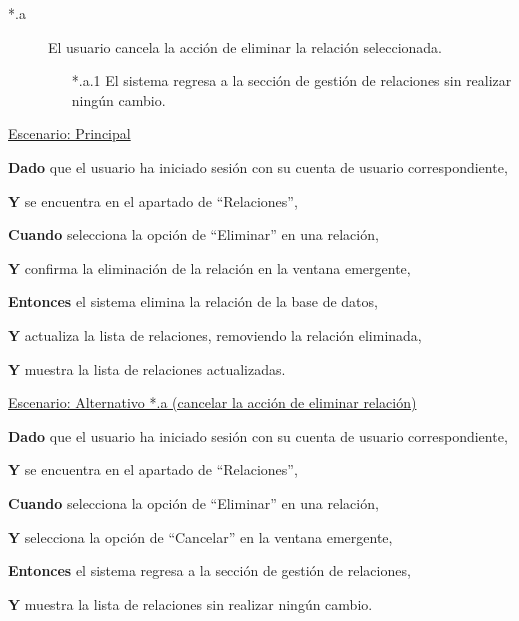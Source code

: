\begin{description}
    \item[*.a] El usuario cancela la acción de eliminar la relación seleccionada.
    \begin{enumerate}
        \item[*.a.1] El sistema regresa a la sección de gestión de relaciones sin realizar ningún cambio.
    \end{enumerate}
\end{description}

\underline{Escenario: Principal}\par
\vspace{0.15cm}

\textbf{Dado} que el usuario ha iniciado sesión con su cuenta de usuario correspondiente,\par
\textbf{Y} se encuentra en el apartado de \enquote{Relaciones},\par
\textbf{Cuando} selecciona la opción de \enquote{Eliminar} en una relación,\par
\textbf{Y} confirma la eliminación de la relación en la ventana emergente,\par
\textbf{Entonces} el sistema elimina la relación de la base de datos,\par
\textbf{Y} actualiza la lista de relaciones, removiendo la relación eliminada,\par
\textbf{Y} muestra la lista de relaciones actualizadas.\par

\vspace{0.20cm}

\underline{Escenario: Alternativo *.a (cancelar la acción de eliminar relación)}\par
\vspace{0.15cm}
\textbf{Dado} que el usuario ha iniciado sesión con su cuenta de usuario correspondiente,\par
\textbf{Y} se encuentra en el apartado de \enquote{Relaciones},\par
\textbf{Cuando} selecciona la opción de \enquote{Eliminar} en una relación,\par
\textbf{Y} selecciona la opción de \enquote{Cancelar} en la ventana emergente,\par
\textbf{Entonces} el sistema regresa a la sección de gestión de relaciones,\par
\textbf{Y} muestra la lista de relaciones sin realizar ningún cambio.\par

